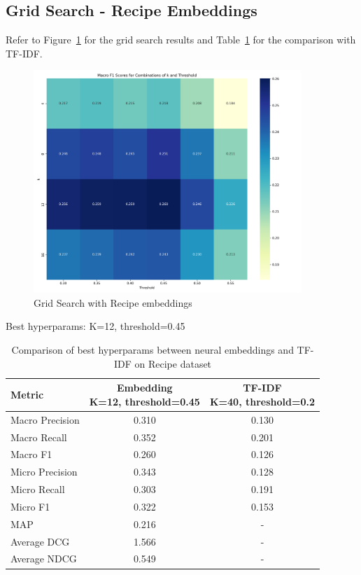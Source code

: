 \documentclass[a4paper,11pt]{article}
\begin{document}
\subsection{Grid Search - Recipe Embeddings}
Refer to Figure~\ref{fig:recipe_embeddings_heatmap} for the grid search results and Table~\ref{tab:recipe_embeddings} for the comparison with TF-IDF.
\begin{figure}
    \centering
    \includegraphics[width=0.9\textwidth]{recipies_embeddings_heatmap.png_1747347706.png}
    \caption{Grid Search with Recipe embeddings}
    \label{fig:recipe_embeddings_heatmap}
\end{figure}

Best hyperparams: K=12, threshold=0.45
\begin{table}
    \centering
    \begin{tabular}{|l|c|c|}
        \hline
        Metric          & \makecell{Embedding         \\K=12, threshold=0.45} & \makecell{TF-IDF \\K=40, threshold=0.2}  \\
        \hline
        Macro Precision & 0.310               & 0.130 \\
        Macro Recall    & 0.352               & 0.201 \\
        Macro F1        & 0.260               & 0.126 \\
        Micro Precision & 0.343               & 0.128 \\
        Micro Recall    & 0.303               & 0.191 \\
        Micro F1        & 0.322               & 0.153 \\
        MAP             & 0.216               & -     \\
        Average DCG     & 1.566               & -     \\
        Average NDCG    & 0.549               & -     \\
        \hline
    \end{tabular}
    \caption{Comparison of best hyperparams between neural embeddings and TF-IDF on Recipe dataset}
    \label{tab:recipe_embeddings}
\end{table}
\end{document}

